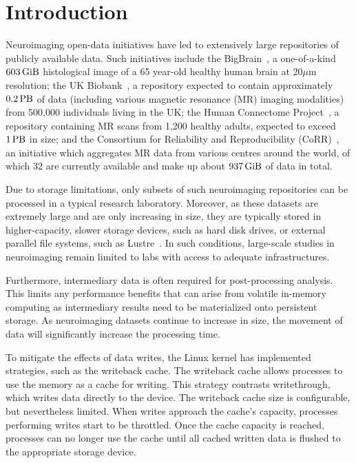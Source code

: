 \documentclass[conference]{IEEEtran}
\newcommand{\bigbrain}{BigBrain\xspace}
\begin{document}
\section{Introduction}
Neuroimaging open-data initiatives have led to extensively large repositories of
publicly available data. Such initiatives include the \bigbrain~\cite{BigBrain}, 
a one-of-a-kind $\SI{603}{\gibi\byte}$
histological image of a 65 year-old healthy human brain
at 20$\mu$m resolution; the UK Biobank~\cite{ukbiobank}, a repository expected to
contain approximately $\SI{0.2}{\peta\byte}$ of data (including various magnetic
resonance (MR) imaging modalities) from 500,000 individuals living in the UK;
the Human Connectome Project~\cite{HCP}, a repository containing MR scans from
1,200 healthy adults, expected to exceed $\SI{1}{\peta\byte}$ in size; 
and the Consortium for Reliability and Reproducibility (CoRR)~\cite{corr}, an
initiative which aggregates MR data from various centres around the world, 
of which 32 are currently available and make up about $\SI{937}{\gibi\byte}$ of
data in total.

Due to storage limitations, only subsets of such neuroimaging repositories 
can be processed in a typical research laboratory. Moreover, as these datasets 
are extremely large and are only increasing in size, they are typically stored 
in higher-capacity, slower storage devices, such as hard disk drives, or external
parallel file systems, such as Lustre~\cite{lustre}. In such conditions, large-scale 
studies in neuroimaging remain limited to labs with access to adequate 
infrastructures.

Furthermore, intermediary data is often required for post-processing analysis. This limits
any performance benefits that can arise from volatile in-memory computing as intermediary
results need to be materialized onto persistent storage. As neuroimaging datasets continue
to increase in size, the movement of data will significantly increase the processing time.

To mitigate the effects of data writes, the Linux kernel has implemented
strategies, such as the writeback cache. The writeback cache
allows processes to use the memory as a cache for writing. This strategy contrasts writethrough, which 
writes data directly to the device. The writeback cache size
is configurable, but nevertheless limited. When writes approach the cache's capacity,
processes performing writes start to be throttled. Once the cache capacity is reached,
processes can no longer use the cache until all cached written data is flushed
to the appropriate storage device.
\end{document}

